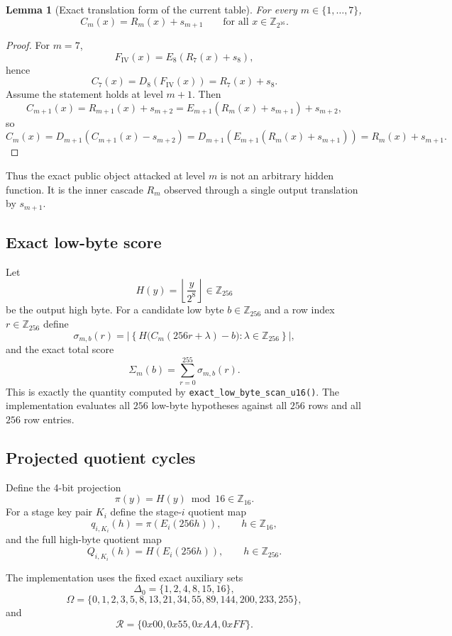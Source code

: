 \documentclass[11pt]{article}
\newtheorem{lemma}{Lemma}
\newcommand{\Z}[1]{\mathbb{Z}_{#1}}
\begin{document}
\begin{lemma}[Exact translation form of the current table]
\label{lem:current-table}
For every $m\in\{1,\dots,7\}$,
\[
C_m(x)=R_m(x)+s_{m+1}
\qquad\text{for all }x\in\Z{2^{16}}.
\]
\end{lemma}

\begin{proof}
For $m=7$,
\[
F_{\mathrm{IV}}(x)=E_8(R_7(x)+s_8),
\]
hence
\[
C_7(x)=D_8(F_{\mathrm{IV}}(x))=R_7(x)+s_8.
\]
Assume the statement holds at level $m+1$. Then
\[
C_{m+1}(x)=R_{m+1}(x)+s_{m+2}
=
E_{m+1}(R_m(x)+s_{m+1})+s_{m+2},
\]
so
\[
C_m(x)
=
D_{m+1}(C_{m+1}(x)-s_{m+2})
=
D_{m+1}(E_{m+1}(R_m(x)+s_{m+1}))
=
R_m(x)+s_{m+1}.
\]
\end{proof}

Thus the exact public object attacked at level $m$ is not an arbitrary hidden function. It is the inner cascade $R_m$ observed through a single output translation by $s_{m+1}$.

\subsection{Exact low-byte score}
Let
\[
H(y)=\left\lfloor \frac{y}{2^8}\right\rfloor \in \Z{256}
\]
be the output high byte. For a candidate low byte $b\in\Z{256}$ and a row index $r\in\Z{256}$ define
\[
\sigma_{m,b}(r)
=
\left|
\left\{
H\bigl(C_m(256r+\lambda)-b\bigr)
:
\lambda\in\Z{256}
\right\}
\right|,
\]
and the exact total score
\[
\Sigma_m(b)=\sum_{r=0}^{255}\sigma_{m,b}(r).
\]
This is exactly the quantity computed by \texttt{exact\_low\_byte\_scan\_u16()}. The implementation evaluates all $256$ low-byte hypotheses against all $256$ rows and all $256$ row entries.

\subsection{Projected quotient cycles}
Define the 4-bit projection
\[
\pi(y)=H(y)\bmod 16 \in \Z{16}.
\]
For a stage key pair $K_i$ define the stage-$i$ quotient map
\[
q_{i,K_i}(h)=\pi(E_i(256h)),
\qquad h\in\Z{16},
\]
and the full high-byte quotient map
\[
Q_{i,K_i}(h)=H(E_i(256h)),
\qquad h\in\Z{256}.
\]

The implementation uses the fixed exact auxiliary sets
\[
\Delta_0=\{1,2,4,8,15,16\},
\]
\[
\Omega=\{0,1,2,3,5,8,13,21,34,55,89,144,200,233,255\},
\]
and
\[
\mathcal R=\{0x00,0x55,0xAA,0xFF\}.
\]
\end{document}
